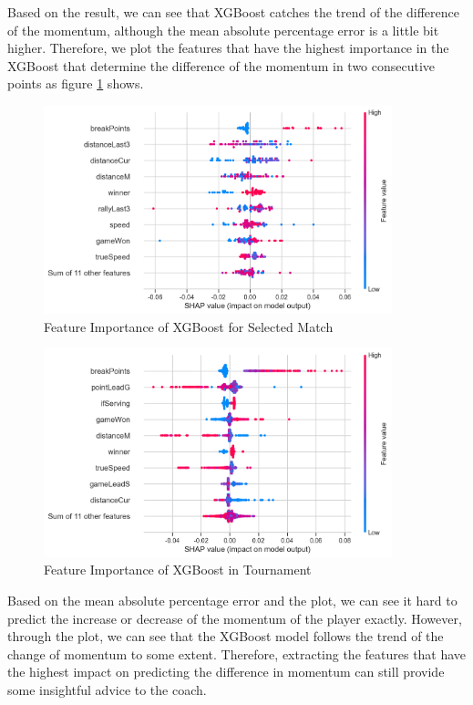 \documentclass[12pt]{article}
\begin{document}
Based on the result, we can see that XGBoost catches the trend of the difference of the momentum, although the mean absolute percentage error is a little bit higher. 
Therefore, we plot the features that have the highest importance in the XGBoost that determine the difference of the momentum in two consecutive points as figure  \ref{fig:10} shows.
\begin{figure}[h!]
    \centering
    \includegraphics[width=0.9\textwidth, height=0.5\textwidth]{determinstic_value.png}
    \caption{Feature Importance of XGBoost for Selected Match}
    \label{fig:10}
\end{figure}

\begin{figure}[h!]
    \centering
    \includegraphics[width=0.9\textwidth, height=0.5\textwidth]{XGboost_match.png}
    \caption{Feature Importance of XGBoost in Tournament}
    \label{fig:11}
\end{figure}

Based on the mean absolute percentage error and the plot, we can see it hard to predict the increase or decrease of the momentum of the player exactly. However, through the
plot, we can see that the XGBoost model follows the trend of the change of momentum to some extent. Therefore, extracting the features that have the highest impact on predicting the 
difference in momentum can still provide some insightful advice to the coach. 
\end{document}
